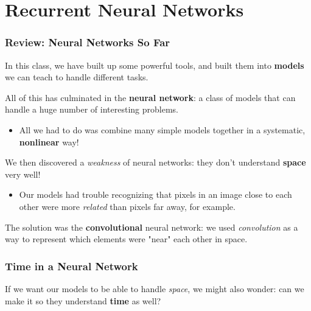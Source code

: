 

\setcounter{chapter}{10-1} %

\chapter{Recurrent Neural Networks}

    \subsection{Review: Neural Networks So Far}

        In this class, we have built up some powerful tools, and built them into \textbf{models} we can teach to handle different tasks.
        
        All of this has culminated in the \textbf{neural network}: a class of models that can handle a huge number of interesting problems.
        
            \begin{itemize}
                \item All we had to do was combine many simple models together in a systematic, \textbf{nonlinear} way!
            \end{itemize}
        
        We then discovered a \textit{weakness} of neural networks: they don't understand \textbf{space} very well! 
            \begin{itemize}
                \item Our models had trouble recognizing that pixels in an image close to each other were more \textit{related} than pixels far away, for example.
            \end{itemize}
            
        The solution was the \textbf{convolutional} neural network: we used \textit{convolution} as a way to represent which elements were "near" each other in space.
        
    \secdiv
        
    \subsection{Time in a Neural Network}
    
        If we want our models to be able to handle \textit{space}, we might also wonder: can we make it so they understand \textbf{time} as well?
        
